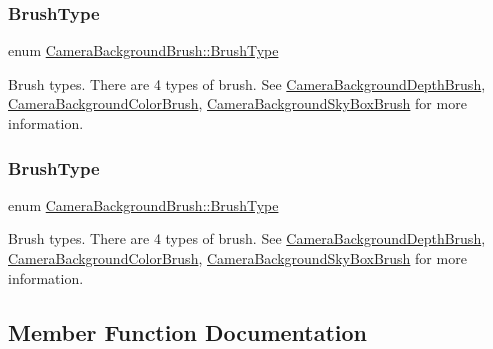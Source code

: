 \subsubsection{\texorpdfstring{Brush\+Type}{BrushType}\hspace{0.1cm}{\footnotesize\ttfamily [1/2]}}
{\footnotesize\ttfamily enum \hyperlink{classCameraBackgroundBrush_acb83e8d05e7ab9386c041d22c444760f}{Camera\+Background\+Brush\+::\+Brush\+Type}\hspace{0.3cm}{\ttfamily [strong]}}

Brush types. There are 4 types of brush. See \hyperlink{classCameraBackgroundDepthBrush}{Camera\+Background\+Depth\+Brush}, \hyperlink{classCameraBackgroundColorBrush}{Camera\+Background\+Color\+Brush}, \hyperlink{classCameraBackgroundSkyBoxBrush}{Camera\+Background\+Sky\+Box\+Brush} for more information. \mbox{\label{classCameraBackgroundBrush_acb83e8d05e7ab9386c041d22c444760f}} 
\subsubsection{\texorpdfstring{Brush\+Type}{BrushType}\hspace{0.1cm}{\footnotesize\ttfamily [2/2]}}
{\footnotesize\ttfamily enum \hyperlink{classCameraBackgroundBrush_acb83e8d05e7ab9386c041d22c444760f}{Camera\+Background\+Brush\+::\+Brush\+Type}\hspace{0.3cm}{\ttfamily [strong]}}

Brush types. There are 4 types of brush. See \hyperlink{classCameraBackgroundDepthBrush}{Camera\+Background\+Depth\+Brush}, \hyperlink{classCameraBackgroundColorBrush}{Camera\+Background\+Color\+Brush}, \hyperlink{classCameraBackgroundSkyBoxBrush}{Camera\+Background\+Sky\+Box\+Brush} for more information. 

\subsection{Member Function Documentation}
\mbox{\label{classCameraBackgroundBrush_ab96c9c64b0a0cc6550b6252f6d4ffcb9}} 
